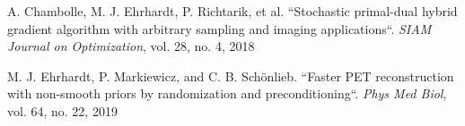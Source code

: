 \documentclass{IEEEtran}
\begin{document}

\begin{thebibliography}{00}
A. Chambolle, M. J. Ehrhardt, P. Richtarik, et al. 
``Stochastic primal-dual hybrid gradient algorithm with arbitrary sampling and imaging
applications``. 
\textit{SIAM Journal on Optimization}, vol. 28, no. 4, 2018

 M. J. Ehrhardt, P. Markiewicz, and C. B. Sch\"onlieb. 
``Faster PET reconstruction with non-smooth priors by randomization and preconditioning``. 
\textit{Phys Med Biol}, vol. 64, no. 22, 2019
\end{thebibliography}
\end{document}
